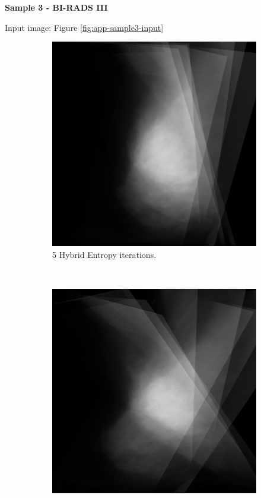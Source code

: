 \newpage
\noindent \textbf{Sample 3 - BI-RADS III}

Input image: Figure \ref{fig:app-sample3-input}

\begin{figure}[H]
    \centering
    \begin{subfigure}[t]{0.3\textwidth}
        \includegraphics[width=\textwidth]{Appendix5/sample3/hybrid/5_hybrid.png}
        \caption{5 Hybrid Entropy iterations.}
        \label{fig:app-5-hybrid-sample3}
    \end{subfigure} \hfill
    ~ %
    \begin{subfigure}[t]{0.3\textwidth}
        \includegraphics[width=\textwidth]{Appendix5/sample3/hybrid/10_hybrid.png}

\end{subfigure}
\end{figure}
